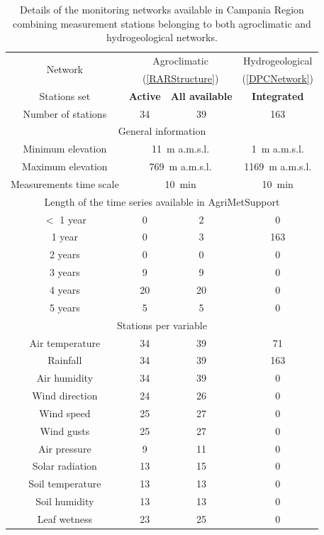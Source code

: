 \documentclass[authoryear,preprint,review,12pt]{elsarticle}
\begin{document}
\begin{table}[]
    \begin{scriptsize}
    \centering
    \begin{tabular}{c|c|c|c}
        \multirow{2}{*}{Network} & \multicolumn{2}{c|}{\footnotesize{Agroclimatic}} & \footnotesize{Hydrogeological} \\
        & \multicolumn{2}{c|}{\footnotesize{(\cref{RARStructure})}} & \footnotesize{(\cref{DPCNetwork})} \\
        Stations set & \textbf{\scriptsize{Active}} & \textbf{\scriptsize{All available}} & \textbf{\scriptsize{Integrated}} \\ 
        \hline
        Number of stations & 34 & 39 & 163\\
        \hline
        \multicolumn{4}{c}{General information} \\
        \hline
        Minimum elevation & \multicolumn{2}{c}{\SI{11}{\metre} a.m.s.l.} & \SI{1}{\metre} a.m.s.l. \\
        Maximum elevation & \multicolumn{2}{c}{\SI{769}{\metre} a.m.s.l.} & \SI{1169}{\metre} a.m.s.l.\\
        Measurements time scale & \multicolumn{2}{c}{\SI{10}{\minute}} & \SI{10}{\minute} \\
        \hline
        \multicolumn{4}{c}{Length of the time series available in AgriMetSupport} \\
        \hline
        $<$ 1 year & 0 & 2 & 0 \\
        1 year & 0 & 3 & 163\\
        2 years & 0 & 0 & 0 \\
        3 years & 9 & 9 & 0\\
        4 years & 20 & 20 & 0\\
        5 years & 5 & 5 & 0\\
        \hline
        \multicolumn{4}{c}{Stations per variable} \\
        \hline
        Air temperature & 34 & 39 & 71\\
        Rainfall & 34 & 39 & 163\\
        Air humidity & 34 & 39 & 0\\
        Wind direction & 24 & 26 & 0\\
        Wind speed & 25 & 27 & 0\\
        Wind gusts & 25 & 27 & 0\\
        Air pressure & 9 & 11 & 0\\
        Solar radiation & 13 & 15 & 0\\
        Soil temperature & 13 & 13 & 0\\
        Soil humidity & 13 & 13 & 0\\
        Leaf wetness & 23 & 25 & 0 
    \end{tabular}
    \caption{Details of the monitoring networks available  in Campania Region combining measurement stations belonging to both agroclimatic and hydrogeological networks.}
    \label{tab:rarSummary}
    \end{scriptsize}
\end{table}
\end{document}
